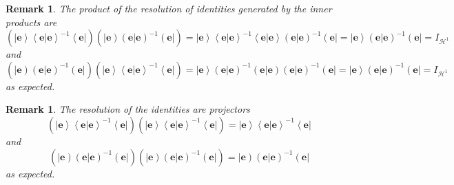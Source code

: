 \documentclass[aps,preprint]{revtex4}%
\newtheorem{remark}[theorem]{Remark}
\begin{document}
\begin{remark}
The product of the resolution of identities generated by the inner products
are
\begin{equation}
\left(  \overset{}{\left\vert \mathbf{e}\right\rangle \left\langle \left.
\mathbf{e}\right\vert \mathbf{e}\right\rangle ^{-1}\left\langle \mathbf{e}%
\right\vert }\right)  \left(  \overset{}{\left\vert \mathbf{e}\right)  \left(
\left.  \mathbf{e}\right\vert \mathbf{e}\right)  ^{-1}\left(  \mathbf{e}%
\right\vert }\right)  =\left\vert \mathbf{e}\right\rangle \left\langle \left.
\mathbf{e}\right\vert \mathbf{e}\right\rangle ^{-1}\left\langle \left.
\mathbf{e}\right\vert \mathbf{e}\right\rangle \left(  \left.  \mathbf{e}%
\right\vert \mathbf{e}\right)  ^{-1}\left(  \mathbf{e}\right\vert =\left\vert
\overset{}{\mathbf{e}}\right\rangle \left(  \left.  \mathbf{e}\right\vert
\mathbf{e}\right)  ^{-1}\left(  \overset{}{\mathbf{e}}\right\vert
=I_{\mathcal{H}^{1}}%
\end{equation}
and
\begin{equation}
\left(  \overset{}{\left\vert \mathbf{e}\right)  \left(  \left.
\mathbf{e}\right\vert \mathbf{e}\right)  ^{-1}\left(  \mathbf{e}\right\vert
}\right)  \left(  \overset{}{\left\vert \mathbf{e}\right\rangle \left\langle
\left.  \mathbf{e}\right\vert \mathbf{e}\right\rangle ^{-1}\left\langle
\mathbf{e}\right\vert }\right)  =\left\vert \mathbf{e}\right\rangle \left(
\left.  \mathbf{e}\right\vert \mathbf{e}\right)  ^{-1}\left(  \left.
\mathbf{e}\right\vert \mathbf{e}\right)  \left(  \left.  \mathbf{e}\right\vert
\mathbf{e}\right)  ^{-1}\left(  \mathbf{e}\right\vert =\left\vert
\overset{}{\mathbf{e}}\right\rangle \left(  \left.  \mathbf{e}\right\vert
\mathbf{e}\right)  ^{-1}\left(  \overset{}{\mathbf{e}}\right\vert
=I_{\mathcal{H}^{1}}%
\end{equation}
as expected.
\end{remark}

\begin{remark}
The resolution of the identities are projectors
\begin{equation}
\left(  \left\vert \mathbf{e}\right\rangle \left\langle \left.  \mathbf{e}%
\right\vert \mathbf{e}\right\rangle ^{-1}\left\langle \mathbf{e}\right\vert
\right)  \left(  \left\vert \mathbf{e}\right\rangle \left\langle \left.
\mathbf{e}\right\vert \mathbf{e}\right\rangle ^{-1}\left\langle \mathbf{e}%
\right\vert \right)  =\left\vert \mathbf{e}\right\rangle \left\langle \left.
\mathbf{e}\right\vert \mathbf{e}\right\rangle ^{-1}\left\langle \mathbf{e}%
\right\vert
\end{equation}
and%
\begin{equation}
\left(  \left\vert \mathbf{e}\right)  \left(  \left.  \mathbf{e}\right\vert
\mathbf{e}\right)  ^{-1}\left(  \mathbf{e}\right\vert \right)  \left(
\left\vert \mathbf{e}\right)  \left(  \left.  \mathbf{e}\right\vert
\mathbf{e}\right)  ^{-1}\left(  \mathbf{e}\right\vert \right)  =\left\vert
\mathbf{e}\right)  \left(  \left.  \mathbf{e}\right\vert \mathbf{e}\right)
^{-1}\left(  \mathbf{e}\right\vert
\end{equation}
as expected.
\end{remark}
\end{document}
